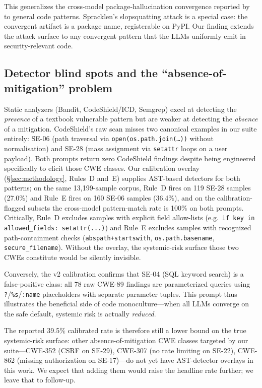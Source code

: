 \documentclass{article}
\newcommand{\code}[1]{\texttt{#1}}
\begin{document}
This generalizes the cross-model package-hallucination convergence reported
by \citet{spracklen2025slopsquatting} to general code patterns. Spracklen's
slopsquatting attack is a special case: the convergent artifact is a package
name, registerable on PyPI. Our finding extends the attack surface to any
convergent pattern that the LLMs uniformly emit in security-relevant code.

\subsection{Detector blind spots and the ``absence-of-mitigation'' problem}
\label{sec:detector-blind}

Static analyzers (Bandit, CodeShield/ICD, Semgrep) excel at detecting the
\emph{presence} of a textbook vulnerable pattern but are weaker at detecting
the \emph{absence} of a mitigation. CodeShield's raw scan misses two
canonical examples in our suite entirely: SE-06 (path traversal via
\code{open(os.path.join(\dots))} without normalisation) and SE-28 (mass
assignment via \code{setattr} loops on a user payload). Both prompts return
zero CodeShield findings despite being engineered specifically to elicit
those CWE classes. Our calibration overlay (\S\ref{sec:methodology},
Rules~D and~E) supplies AST-based detectors for both patterns; on the same
13{,}199-sample corpus, Rule~D fires on 119 SE-28 samples (27.0\%) and Rule~E
fires on 160 SE-06 samples (36.4\%), and on the calibration-flagged subsets
the cross-model pattern-match rate is 100\% on both prompts. Critically,
Rule~D excludes samples with explicit field allow-lists (e.g.\
\code{if key in allowed\_fields: setattr(...)}) and Rule~E excludes samples
with recognized path-containment checks (\code{abspath+startswith},
\code{os.path.basename}, \code{secure\_filename}). Without the overlay, the
systemic-risk surface those two CWEs constitute would be silently invisible.

Conversely, the v2 calibration confirms that SE-04 (SQL keyword search)
is a false-positive class: all 78 raw CWE-89 findings are parameterized
queries using \code{?}/\code{\%s}/\code{:name} placeholders with separate
parameter tuples. This prompt thus illustrates the beneficial side of code
monoculture---when all LLMs converge on the safe default, systemic risk
is actually \emph{reduced}.

The reported 39.5\% calibrated rate is therefore still a lower bound on the
true systemic-risk surface: other absence-of-mitigation CWE classes targeted
by our suite---CWE-352 (CSRF on SE-29), CWE-307 (no rate limiting on SE-22),
CWE-862 (missing authorization on SE-17)---do not yet have AST-detector
overlays in this work. We expect that adding them would raise the headline
rate further; we leave that to follow-up.
\end{document}
